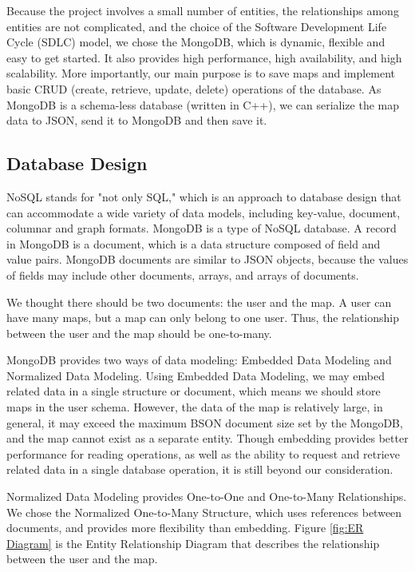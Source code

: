 Because the project involves a small number of entities, the relationships among entities are not complicated, and the choice of the Software Development Life Cycle (SDLC) model, we chose the MongoDB, which is dynamic, flexible and easy to get started. It also provides high performance, high availability, and high scalability. More importantly, our main purpose is to save maps and implement basic CRUD (create, retrieve, update, delete) operations of the database. As MongoDB is a schema-less database (written in C++), we can serialize the map data to JSON, send it to MongoDB and then save it.

\subsection{Database Design}
\label{sec:Design>Database Design}
NoSQL stands for "not only SQL," which is an approach to database design that can accommodate a wide variety of data models, including key-value, document, columnar and graph formats. MongoDB is a type of NoSQL database. A record in MongoDB is a document, which is a data structure composed of field and value pairs. MongoDB documents are similar to JSON objects, because the values of fields may include other documents, arrays, and arrays of documents.

We thought there should be two documents: the user and the map. A user can have many maps, but a map can only belong to one user. Thus, the relationship between the user and the map should be one-to-many.

MongoDB provides two ways of data modeling: Embedded Data Modeling and Normalized Data Modeling. Using Embedded Data Modeling, we may embed related data in a single structure or document, which means we should store maps in the user schema. However, the data of the map is relatively large, in general, it may exceed the maximum BSON document size set by the MongoDB, and the map cannot exist as a separate entity. Though embedding provides better performance for reading operations, as well as the ability to request and retrieve related data in a single database operation, it is still beyond our consideration.

Normalized Data Modeling provides One-to-One and One-to-Many Relationships. We chose the Normalized One-to-Many Structure, which uses references between documents, and provides more flexibility than embedding. Figure \ref{fig:ER Diagram} is the Entity Relationship Diagram that describes the relationship between the user and the map.


